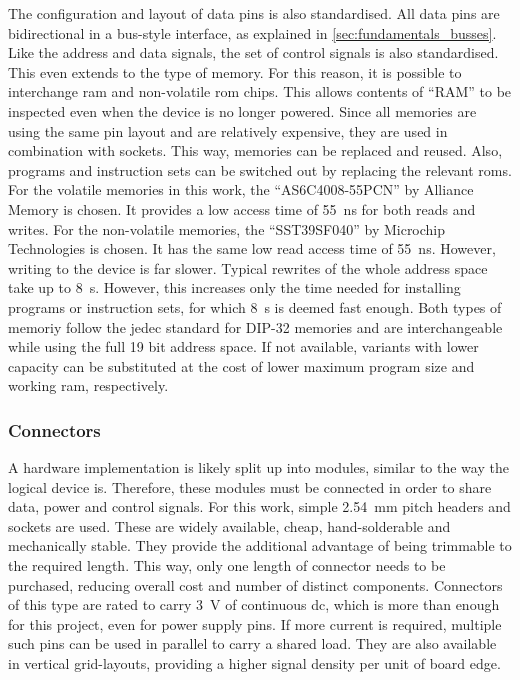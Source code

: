 The configuration and layout of data pins is also standardised. All data pins are bidirectional in a bus-style interface, as explained in \autoref{sec:fundamentals_busses}. Like the address and data signals, the set of control signals is also standardised. This even extends to the type of memory. For this reason, it is possible to interchange \ac{ram} and non-volatile \ac{rom} chips. This allows contents of ``RAM'' to be inspected even when the device is no longer powered. Since all memories are using the same pin layout and are relatively expensive, they are used in combination with sockets. This way, memories can be replaced and reused. Also, programs and instruction sets can be switched out by replacing the relevant \acp{rom}.
\\

For the volatile memories in this work, the ``AS6C4008-55PCN'' by Alliance Memory is chosen. It provides a low access time of \SI{55}{\nano\second} for both reads and writes\cite[page 1]{alliance_as6c4008}. For the non-volatile memories, the ``SST39SF040'' by Microchip Technologies is chosen. It has the same low read access time of \SI{55}{\nano\second}. However, writing to the device is far slower. Typical rewrites of the whole address space take up to \SI{8}{\second}\cite[page 1]{microchip_sst39sf040}. However, this increases only the time needed for installing programs or instruction sets, for which \SI{8}{\second} is deemed fast enough. Both types of memoriy follow the \ac{jedec} standard for DIP-32 memories and are interchangeable while using the full 19 bit address space. If not available, variants with lower capacity can be substituted at the cost of lower maximum program size and working \ac{ram}, respectively.

\subsubsection*{Connectors}

A hardware implementation is likely split up into modules, similar to the way the logical device is. Therefore, these modules must be connected in order to share data, power and control signals. For this work, simple \SI{2.54}{\milli\meter} pitch headers and sockets are used. These are widely available, cheap, hand-solderable and mechanically stable. They provide the additional advantage of being trimmable to the required length. This way, only one length of connector needs to be purchased, reducing overall cost and number of distinct components. Connectors of this type are rated to carry \SI{3}{\volt} of continuous \ac{dc}\cite{multicomp_2213r_series}, which is more than enough for this project, even for power supply pins. If more current is required, multiple such pins can be used in parallel to carry a shared load. They are also available in vertical grid-layouts, providing a higher signal density per unit of board edge.
\\

